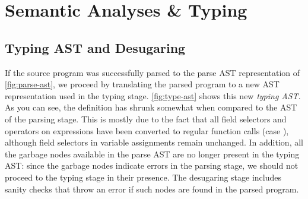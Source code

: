 \chapter{Semantic Analyses \& Typing} \label{chp:semantic-analyses}


\section{Typing AST and Desugaring} \label{sec:desugaring}

If the source program was successfully parsed to the parse AST representation of
\cref{fig:parse-ast}, we proceed by translating the parsed program to a new AST
representation used in the typing stage.
\cref{fig:type-ast} shows this new \emph{typing AST}.
As you can see, the definition has shrunk somewhat when compared to the AST of
the parsing stage. This is mostly due to the fact that all field selectors and
operators on expressions have been converted to regular function calls (case
), although field selectors in variable assignments remain
unchanged.
In addition, all the garbage nodes available in the parse AST are no longer
present in the typing AST: since the garbage nodes indicate errors in the
parsing stage, we should not proceed to the typing stage in their presence.
The desugaring stage includes sanity checks that throw an error if such nodes
are found in the parsed program.

